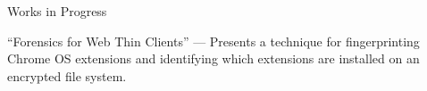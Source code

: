 \begin{rSubsection}{Works in Progress}

  \item ``Forensics for Web Thin Clients'' --- Presents a technique for fingerprinting Chrome OS extensions and identifying which extensions are installed on an encrypted file system.

\end{rSubsection}
